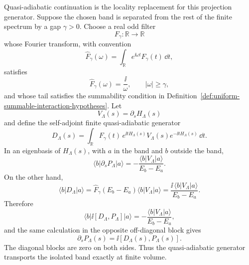 Quasi-adiabatic continuation is the locality replacement for this projection
generator.  Suppose the chosen band is separated from the rest of the finite
spectrum by a gap \(\gamma>0\).  Choose a real odd filter
\[
  F_\gamma:\mathbb R\longrightarrow\mathbb R
\]
whose Fourier transform, with convention
\[
  \widehat F_\gamma(\omega)=\int_{\mathbb R}e^{\ii\omega t}F_\gamma(t)\,\dd t,
\]
satisfies
\[
  \widehat F_\gamma(\omega)=\frac{\ii}{\omega},
  \qquad |\omega|\ge\gamma,
\]
and whose tail satisfies the summability condition in
Definition~\ref{def:uniform-summable-interaction-hypotheses}.  Let
\[
  V_\Lambda(s)=\partial_sH_\Lambda(s)
\]
and define the self-adjoint finite quasi-adiabatic generator
\begin{equation}
  D_\Lambda(s)=
  \int_{\mathbb R}
  F_\gamma(t)\,
  e^{\ii tH_\Lambda(s)}V_\Lambda(s)e^{-\ii tH_\Lambda(s)}
  \,\dd t .
  \label{eq:finite-quasi-adiabatic-generator}
\end{equation}
In an eigenbasis of \(H_\Lambda(s)\), with \(a\) in the band and \(b\)
outside the band,
\[
  \langle b|\partial_sP_\Lambda|a\rangle
  =
  -\frac{\langle b|V_\Lambda|a\rangle}{E_b-E_a}.
\]
On the other hand,
\[
  \langle b|D_\Lambda|a\rangle
  =
  \widehat F_\gamma(E_b-E_a)\langle b|V_\Lambda|a\rangle
  =
  \frac{\ii\,\langle b|V_\Lambda|a\rangle}{E_b-E_a}.
\]
Therefore
\[
  \langle b|\ii[D_\Lambda,P_\Lambda]|a\rangle
  =
  -\frac{\langle b|V_\Lambda|a\rangle}{E_b-E_a},
\]
and the same calculation in the opposite off-diagonal block gives
\begin{equation}
  \partial_sP_\Lambda(s)=\ii[D_\Lambda(s),P_\Lambda(s)].
  \label{eq:finite-quasi-adiabatic-transports-band}
\end{equation}
The diagonal blocks are zero on both sides.  Thus the quasi-adiabatic
generator transports the isolated band exactly at finite volume.

